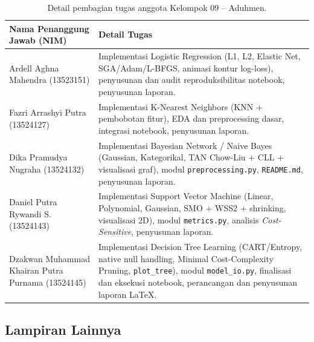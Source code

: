 \documentclass[11pt,a4paper]{article}
\numberwithin{figure}{section}
\numberwithin{table}{section}
\begin{document}
\begin{table}[H]
  \centering
  \small
  \setlength{\tabcolsep}{5pt}
  \caption{Detail pembagian tugas anggota Kelompok 09 -- Aduhmen.}
  \label{tab:pembagian}
  \begin{tabularx}{\textwidth}{|L{4.8cm}|Y|}
    \hline
    \textbf{Nama Penanggung Jawab (NIM)} & \textbf{Detail Tugas} \\
    \hline
    Ardell Aghna Mahendra (13523151) & Implementasi Logistic Regression (L1, L2, Elastic Net, SGA/Adam/L-BFGS, animasi kontur log-loss), penyusunan dan audit reproduksibilitas notebook, penyusunan laporan. \\
    \hline
    Fazri Arrashyi Putra (13524127) & Implementasi K-Nearest Neighbors (KNN + pembobotan fitur), EDA dan preprocessing dasar, integrasi notebook, penyusunan laporan. \\
    \hline
    Dika Pramudya Nugraha (13524132) & Implementasi Bayesian Network / Naive Bayes (Gaussian, Kategorikal, TAN Chow-Liu + CLL + visualisasi graf), modul \texttt{preprocessing.py}, \texttt{README.md}, penyusunan laporan. \\
    \hline
    Daniel Putra Rywandi S. (13524143) & Implementasi Support Vector Machine (Linear, Polynomial, Gaussian, SMO + WSS2 + shrinking, visualisasi 2D), modul \texttt{metrics.py}, analisis \textit{Cost-Sensitive}, penyusunan laporan. \\
    \hline
    Dzakwan Muhammad Khairan Putra Purnama (13524145) & Implementasi Decision Tree Learning (CART/Entropy, native null handling, Minimal Cost-Complexity Pruning, \texttt{plot\_tree}), modul \texttt{model\_io.py}, finalisasi dan eksekusi notebook, perancangan dan penyusunan laporan LaTeX. \\
    \hline
  \end{tabularx}
\end{table}

\subsection{Lampiran Lainnya}
\end{document}
